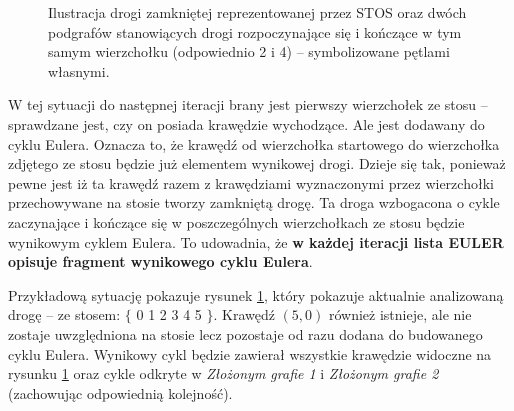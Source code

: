 \begin{figure}
\centering
{}
\label{RysDowodPoprawnosci}
\caption{Ilustracja drogi zamkniętej reprezentowanej przez STOS oraz dwóch podgrafów stanowiących drogi rozpoczynające się i kończące w tym samym wierzchołku (odpowiednio 2 i 4) -- symbolizowane pętlami własnymi.}
\end{figure}

W tej sytuacji do następnej iteracji brany jest pierwszy wierzchołek ze stosu -- sprawdzane jest, czy on posiada krawędzie wychodzące. 
Ale jest dodawany do cyklu Eulera. Oznacza to, że krawędź od wierzchołka startowego do wierzchołka zdjętego ze stosu będzie już elementem wynikowej drogi.
Dzieje się tak, ponieważ pewne jest iż ta krawędź razem z krawędziami wyznaczonymi przez wierzchołki przechowywane na stosie tworzy zamkniętą drogę. 
Ta droga wzbogacona o cykle zaczynające i kończące się w poszczególnych wierzchołkach ze stosu będzie wynikowym cyklem Eulera.
To udowadnia, że \textbf{w każdej iteracji lista EULER opisuje fragment wynikowego cyklu Eulera}.

Przykładową sytuację pokazuje rysunek \ref{RysDowodPoprawnosci}, który pokazuje aktualnie analizowaną drogę -- ze stosem: $\lbrace $ 0 1 2 3 4 5 $\rbrace $. Krawędź $(5, 0)$ również istnieje, ale nie zostaje uwzględniona na stosie lecz pozostaje od razu dodana do budowanego cyklu Eulera. Wynikowy cykl będzie zawierał wszystkie krawędzie widoczne na rysunku \ref{RysDowodPoprawnosci} oraz cykle odkryte w \textit{Złożonym grafie 1} i \textit{Złożonym grafie 2} (zachowując odpowiednią kolejność).


